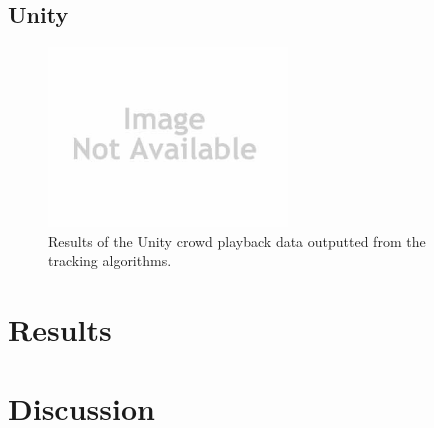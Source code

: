 \documentclass[conference]{IEEEtran}
\begin{document}
\subsection{Unity}

\begin{figure}[!t]
\centering
\includegraphics[width=2.5in]{noImage.jpg}
\caption{Results of the Unity crowd playback data outputted from the tracking algorithms.}
\label{Unity}
\end{figure}

\section{Results}

\section{Discussion}
\end{document}
